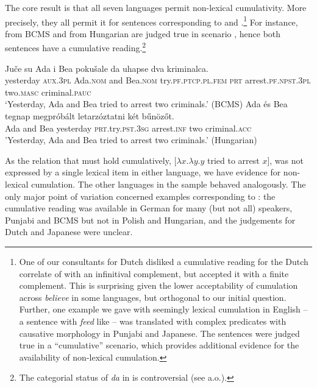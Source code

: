 \documentclass[output=paper]{langscibook}
\begin{document}
\noindent The core result is that all seven languages permit non-lexical cumulativity. More precisely, they all permit it for sentences corresponding to  and  .\footnote{One of our consultants for Dutch disliked a cumulative reading for the Dutch correlate of  with an infinitival complement, but accepted it with a finite complement. This is surprising given the lower acceptability of cumulation across \textit{believe} in some languages, but orthogonal to our initial question. Further, one example we gave with seemingly lexical cumulation in English -- a sentence with \textit{feed} like  -- was translated with complex predicates with causative morphology in Punjabi and Japanese. The sentences were judged true in a ``cumulative'' scenario, which provides additional evidence for the availability of non-lexical cumulation.} 
For instance,   from BCMS and  from Hungarian are judged true in scenario , hence both sentences have a cumulative reading.\footnote{The categorial status of \textit{da} in  is controversial (see \citealt{Todorovic:2020} a.o.).}

\ea\label{has-sch:se1} \gll Ju\v{c}e su Ada i Bea poku\v{s}ale da uhapse dva kriminalca.\\
yesterday \textsc{aux.3pl} Ada.\textsc{nom} and Bea.\textsc{nom} try.\textsc{pf.ptcp.pl.fem} \textsc{prt} arrest.\textsc{pf.npst.3pl} two.\textsc{masc} criminal.\textsc{pauc} \\
\glt `Yesterday, Ada and Bea tried to arrest two criminals.' \phantom{.}\hfill (BCMS)
\ex\label{has-sch:hu1} \gll Ada \'{e}s Bea tegnap megpr\'{o}b\'{a}lt letarz\'{o}ztatni k\'{e}t b\H{u}n\"{o}z\H{o}t. \\
Ada and Bea yesterday \textsc{prt}.try.\textsc{pst}.\textsc{3sg} arrest.\textsc{inf} two criminal.\textsc{acc} \\
\glt 'Yesterday, Ada and Bea tried to arrest two criminals.' \phantom{.}\hfill (Hungarian) 
\z

\noindent As the relation that must hold cumulatively, [$\lambda x.\lambda y. y$ tried to arrest $x$], was not expressed by a single lexical item in either language, we have evidence for non-lexical cumulation. The other languages in the sample behaved analogously. The only major point of variation concerned examples corresponding to : the cumulative reading was available in German for many (but not all) speakers, Punjabi and BCMS but not in Polish and Hungarian, and the judgements for Dutch and Japanese were unclear. 
\end{document}
